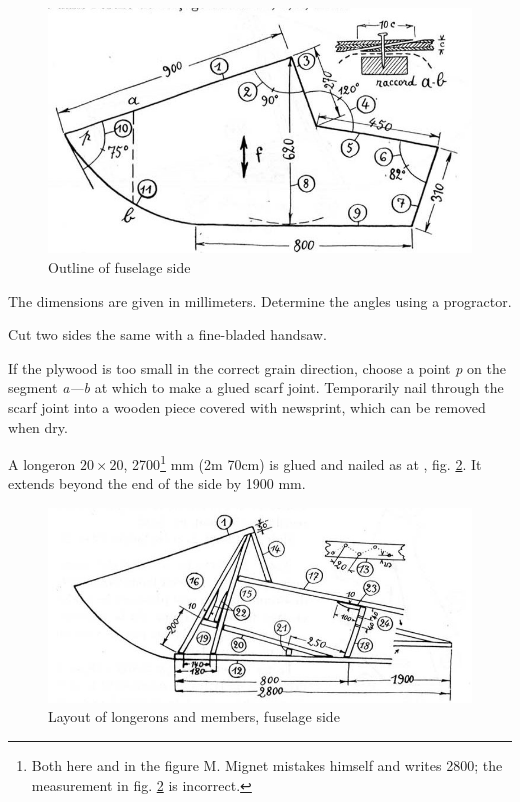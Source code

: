 \documentclass{book}
\newcommand*\circled[1]{\tikz[baseline=(char.base)]{
    \node[shape=circle,draw,inner sep=1pt] (char) {#1};}}
\begin{document}
\begin{figure}
  \includegraphics[width=\linewidth]{fig-16.jpg}
  \caption{Outline of fuselage side}
  \label{fig:sixteen}
\end{figure}

The dimensions are given in millimeters.  Determine the angles using a
progractor.

Cut two sides the same with a fine-bladed handsaw.

If the plywood is too small in the correct grain direction, choose a
point \textsl{p} on the segment \textsl{a---b} at which to make a
glued scarf joint.  Temporarily nail through the scarf joint into a
wooden piece covered with newsprint, which can be removed when dry.

A longeron $20\times20$, 2700\footnote{Both here and in the figure
  M. Mignet mistakes himself and writes 2800; the measurement in
  fig. \ref{fig:seventeen} is incorrect.} mm (2m 70cm) is glued and
nailed as at \circled{12}, fig. \ref{fig:seventeen}.  It extends
beyond the end of the side by 1900 mm.

\begin{figure}
  \includegraphics[width=\linewidth]{fig-17.jpg}
  \caption{Layout of longerons and members, fuselage side}
  \label{fig:seventeen}
\end{figure}
\end{document}
